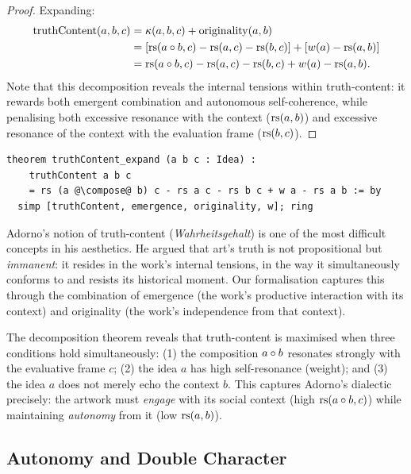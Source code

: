 \begin{proof}
Expanding:
\begin{align*}
  \mathrm{truthContent}(a, b, c)
    &= \kappa(a, b, c) + \mathrm{originality}(a, b) \\
    &= [\mathrm{rs}(a \circ b, c) - \mathrm{rs}(a, c) - \mathrm{rs}(b, c)]
       + [w(a) - \mathrm{rs}(a, b)] \\
    &= \mathrm{rs}(a \circ b, c) - \mathrm{rs}(a, c) - \mathrm{rs}(b, c) + w(a) - \mathrm{rs}(a, b).
\end{align*}
Note that this decomposition reveals the internal tensions within
truth-content: it rewards both emergent combination and autonomous
self-coherence, while penalising both excessive resonance with the
context ($\mathrm{rs}(a, b)$) and excessive resonance of the context with the
evaluation frame ($\mathrm{rs}(b, c)$).
\end{proof}

\begin{lstlisting}
theorem truthContent_expand (a b c : Idea) :
    truthContent a b c
    = rs (a @\compose@ b) c - rs a c - rs b c + w a - rs a b := by
  simp [truthContent, emergence, originality, w]; ring
\end{lstlisting}

\begin{interpretation}
\label{int:truth-adorno}
Adorno's notion of truth-content (\emph{Wahrheitsgehalt}) is one of the
most difficult concepts in his aesthetics.  He argued that art's truth is
not propositional but \emph{immanent}: it resides in the work's internal
tensions, in the way it simultaneously conforms to and resists its
historical moment.  Our formalisation captures this through the combination
of emergence (the work's productive interaction with its context) and
originality (the work's independence from that context).

The decomposition theorem reveals that truth-content is maximised when
three conditions hold simultaneously: (1) the composition $a \circ b$
resonates strongly with the evaluative frame $c$; (2) the idea $a$ has
high self-resonance (weight); and (3) the idea $a$ does not merely
echo the context $b$.  This captures Adorno's dialectic precisely: the
artwork must \emph{engage} with its social context (high $\mathrm{rs}(a \circ b, c)$)
while maintaining \emph{autonomy} from it (low $\mathrm{rs}(a, b)$).
\end{interpretation}

\subsection{Autonomy and Double Character}

